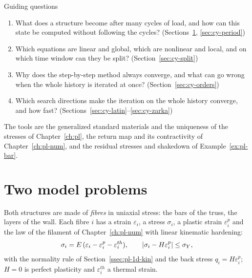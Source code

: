 \begin{gbox}{Guiding questions}
\begin{enumerate}[itemsep=1pt]
  \item What does a structure become after many cycles of load, and how can
  this state be computed without following the cycles?
  (Sections~\ref{sec:cy-models}, \ref{sec:cy-period})
  \item Which equations are linear and global, which are nonlinear and local,
  and on which time window can they be split? (Section~\ref{sec:cy-split})
  \item Why does the step-by-step method always converge, and what can go wrong
  when the whole history is iterated at once? (Section~\ref{sec:cy-orders})
  \item Which search directions make the iteration on the whole history
  converge, and how fast? (Sections~\ref{sec:cy-latin}--\ref{sec:cy-zarka})
\end{enumerate}
The tools are the generalized standard materials and the uniqueness of the
stresses of Chapter~\ref{ch:pl}, the return map and its contractivity of
Chapter~\ref{ch:pl-num}, and the residual stresses and shakedown of
Example~\ref{ex:pl-bar}.
\end{gbox}

\section{Two model problems}\label{sec:cy-models}
%
Both structures are made of \emph{fibres} in uniaxial stress: the bars of the
truss, the layers of the wall. Each fibre $i$ has a strain $\varepsilon_i$, a
stress $\sigma_i$, a plastic strain $\varepsilon^p_i$ and the law of the
filament of Chapter~\ref{ch:pl-num} with linear kinematic hardening:
\begin{equation}\label{eq:cy-fibre}
  \sigma_i=E\,(\varepsilon_i-\varepsilon^p_i-\varepsilon^{th}_i),\qquad
  |\sigma_i-H\varepsilon^p_i|\le\sigma_{Y},
\end{equation}
with the normality rule of Section~\ref{ssec:pl-1d-kin} and the back stress
$q_i=H\varepsilon^p_i$; $H=0$ is perfect plasticity and $\varepsilon^{th}_i$ a
thermal strain.

